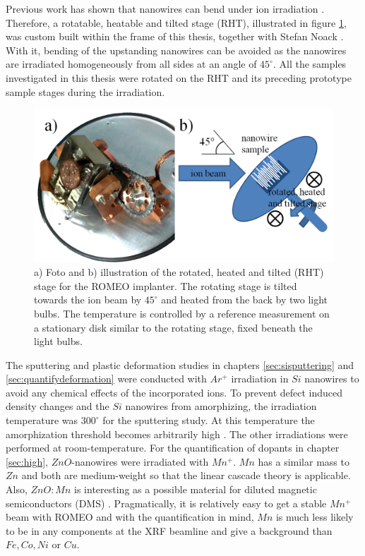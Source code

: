 Previous work has shown that nanowires can bend under ion irradiation \cite{borschel_permanent_2011, borschel_ion-solid_2012}. Therefore, a rotatable, heatable and tilted stage (RHT), illustrated in figure \ref{RHT}, was custom built within the frame of this thesis, together with Stefan Noack \cite{noack_sputter_2014}. With it, bending of the upstanding nanowires can be avoided as the nanowires are irradiated homogeneously from all sides at an angle of $45^\circ$. All the samples investigated in this thesis were rotated on the RHT and its preceding prototype sample stages during the irradiation. 

\begin{figure}[th]
	\centering
		\includegraphics[width=.8\textwidth]{images/RHTfotoscematic.png}
	\caption{a) Foto and b) illustration of the rotated, heated and tilted (RHT) stage for the ROMEO implanter. The rotating stage is tilted towards the ion beam by $45^\circ$ and heated from the back by two light bulbs. The temperature is controlled by a reference measurement on a stationary disk similar to the rotating stage, fixed beneath the light bulbs.}
	\label{RHT}
\end{figure} 

The sputtering and plastic deformation studies in chapters \ref{sec:sisputtering} and \ref{sec:quantifydeformation} were conducted with $Ar^+$ irradiation in $Si$ nanowires to avoid any chemical effects of the incorporated ions. To prevent defect induced density changes and the $Si$ nanowires from amorphizing, the irradiation temperature was $300^\circ$ for the sputtering study. At this temperature the amorphization threshold becomes arbitrarily high \cite{pelaz_ion-beam-induced_2004}. The other irradiations were performed at room-temperature. For the quantification of dopants in chapter \ref{sec:high}, $ZnO$-nanowires were irradiated with $Mn^+$. $Mn$ has a similar mass to $Zn$ and both are medium-weight so that the linear cascade theory is applicable. Also, $ZnO:Mn$ is interesting as a possible material for diluted magnetic semiconductors (DMS) \cite{furdyna_diluted_1988,norberg_synthesis_2004}. Pragmatically, it is relatively easy to get a stable $Mn^+$ beam with ROMEO and with the quantification in mind, $Mn$ is much less likely to be in any components at the XRF beamline and give a background than $Fe, Co, Ni$ or $Cu$.

